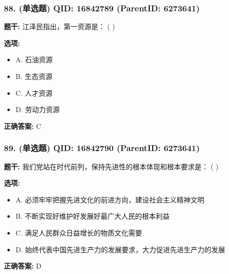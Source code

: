 \documentclass[12pt,UTF8]{ctexart}
\begin{document}
\subsubsection*{88. (单选题) \small QID: 16842789 (ParentID: 6273641)}

\textbf{题干:}
江泽民指出，第一资源是： ( )



\textbf{选项:}
\begin{itemize}[leftmargin=*]

  \item A. 石油资源

  \item B. 生态资源

  \item C. 人才资源

  \item D. 劳动力资源

\end{itemize}

\textbf{正确答案:}
C

\vspace{0.3em}\hrulefill\vspace{0.7em}

\subsubsection*{89. (单选题) \small QID: 16842790 (ParentID: 6273641)}

\textbf{题干:}
我们党站在时代前列，保持先进性的根本体现和根本要求是： ( )



\textbf{选项:}
\begin{itemize}[leftmargin=*]

  \item A. 必须牢牢把握先进文化的前进方向，建设社会主义精神文明

  \item B. 不断实现好维护好发展好最广大人民的根本利益

  \item C. 满足人民群众日益增长的物质文化需要

  \item D. 始终代表中国先进生产力的发展要求，大力促进先进生产力的发展

\end{itemize}

\textbf{正确答案:}
D

\vspace{0.3em}\hrulefill\vspace{0.7em}
\end{document}
